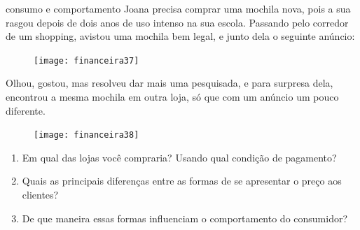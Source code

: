 \begin{task}{consumo e comportamento}
Joana precisa comprar uma mochila nova, pois a sua rasgou depois de dois anos de uso intenso na sua escola. Passando pelo corredor de um shopping, avistou uma mochila bem legal, e junto dela o seguinte anúncio:

\begin{figure}[H]
\centering

\texttt{[image: financeira37]}
\end{figure}

Olhou, gostou, mas resolveu dar mais uma pesquisada, e para surpresa dela, encontrou a mesma mochila em outra loja, só que com um anúncio um pouco diferente.

\begin{figure}[H]
\centering

\texttt{[image: financeira38]}
\end{figure}

\begin{enumerate}
  \item Em qual das lojas você compraria? Usando qual condição de pagamento?
  \item Quais as principais diferenças entre as formas de se apresentar o preço aos clientes?
  \item De que maneira essas formas influenciam o comportamento do consumidor?
\end{enumerate}
\end{task}

